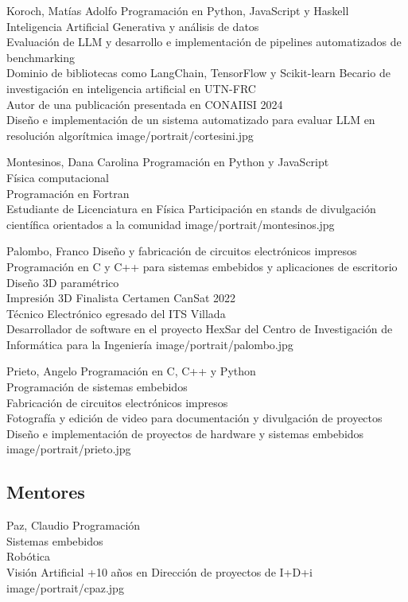 \presentacion
  {Koroch, Matías Adolfo}
  {Programación en Python, JavaScript y Haskell\\Inteligencia Artificial Generativa y análisis de datos\\Evaluación de LLM y desarrollo e implementación de pipelines automatizados de benchmarking\\Dominio de bibliotecas como LangChain, TensorFlow y Scikit-learn}
  {Becario de investigación en inteligencia artificial en UTN-FRC\\Autor de una publicación presentada en CONAIISI 2024\\Diseño e implementación de un sistema automatizado para evaluar LLM en resolución algorítmica}
  {image/portrait/cortesini.jpg}

\presentacion
  {Montesinos, Dana Carolina}
  {Programación en Python y JavaScript\\Física computacional\\Programación en Fortran\\Estudiante de Licenciatura en Física}
  {Participación en stands de divulgación científica orientados a la comunidad}
  {image/portrait/montesinos.jpg}

\presentacion
  {Palombo, Franco}
  {Diseño y fabricación de circuitos electrónicos impresos\\Programación en C y C++ para sistemas embebidos y aplicaciones de escritorio\\Diseño 3D paramétrico\\Impresión 3D}
  {Finalista Certamen CanSat 2022\\Técnico Electrónico egresado del ITS Villada\\Desarrollador de software en el proyecto HexSar del Centro de Investigación de Informática para la Ingeniería}
  {image/portrait/palombo.jpg}

\presentacion
  {Prieto, Angelo}
  {Programación en C, C++ y Python\\Programación de sistemas embebidos\\Fabricación de circuitos electrónicos impresos\\Fotografía y edición de video para documentación y divulgación de proyectos}
  {Diseño e implementación de proyectos de hardware y sistemas embebidos}
  {image/portrait/prieto.jpg}

\subsection{Mentores}
\presentacion
  {Paz, Claudio}
  {Programación\\Sistemas embebidos\\Robótica\\Visión Artificial}
  {+10 años en Dirección de proyectos de I+D+i}
  {image/portrait/cpaz.jpg}

